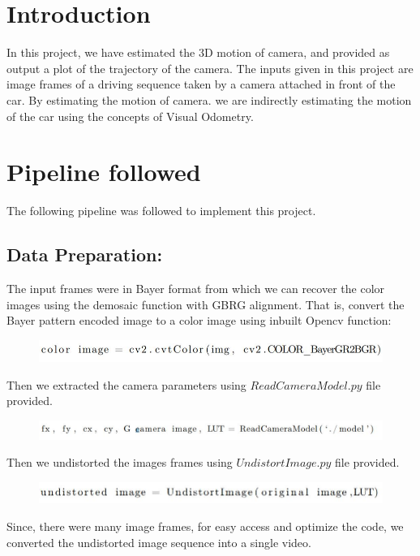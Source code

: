 \documentclass[12pt]{article}
\begin{document}
\section{Introduction} 
In this project, we have estimated the 3D motion of camera, and provided as output a plot of the trajectory of the camera. The inputs given in this project are image frames of a driving sequence taken by a camera attached in front of the car. By estimating the motion of camera. we are indirectly estimating the motion of the car using the concepts of Visual Odometry.

\section{Pipeline followed}
The following pipeline was followed to implement this project.
\subsection{Data Preparation:} The input frames were in Bayer format from which we can recover the color images using the demosaic function with GBRG alignment. That is, convert the Bayer pattern encoded image to a color image using inbuilt Opencv function:

\begin{figure}[h]
    \centering
    \includegraphics[width=12cm]{data1}
\end{figure}

Then we extracted the camera parameters using $ReadCameraModel.py$ file provided.
\begin{figure}[h]
    \centering
    \includegraphics[width=14cm]{data2}
\end{figure}

Then we undistorted the images frames using $UndistortImage.py$ file provided.
\begin{figure}[h]
    \centering
    \includegraphics[width=12cm]{data3}
\end{figure}
Since, there were many image frames, for easy access and optimize the code, we converted the undistorted image sequence into a single video.
\end{document}
